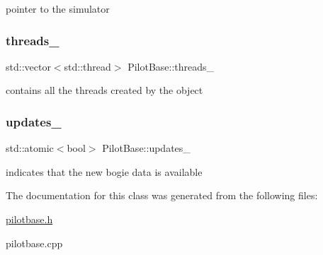 pointer to the simulator \mbox{\label{classPilotBase_a477c1e12ccbb744f1099b8f201993a8d}} 
\subsubsection{\texorpdfstring{threads\+\_\+}{threads\_}}
{\footnotesize\ttfamily std\+::vector$<$std\+::thread$>$ Pilot\+Base\+::threads\+\_\+\hspace{0.3cm}{\ttfamily [protected]}}

contains all the threads created by the object \mbox{\label{classPilotBase_ab45516b59a0299c2fff103980d36fcbb}} 
\subsubsection{\texorpdfstring{updates\+\_\+}{updates\_}}
{\footnotesize\ttfamily std\+::atomic$<$bool$>$ Pilot\+Base\+::updates\+\_\+\hspace{0.3cm}{\ttfamily [protected]}}

indicates that the new bogie data is available 

The documentation for this class was generated from the following files\+:\begin{DoxyCompactItemize}
\item 
\hyperlink{pilotbase_8h}{pilotbase.\+h}\item 
pilotbase.\+cpp\end{DoxyCompactItemize}
